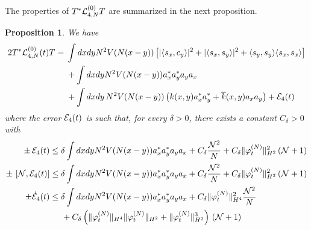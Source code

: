 \documentclass[11pt,a4paper,DIV11]{scrartcl}	%
\newtheorem{proposition}[thm]{Proposition}
\newcommand{\cE}{{\cal E}}
\newcommand{\cL}{{\cal L}}
\newcommand{\cN}{{\cal N}}
\begin{document}
The properties of $T^* \cL^{(0)}_{4,N} T$ are summarized in the next proposition. 
\begin{proposition}\label{prop:TL4T}
We have 
\begin{equation}\begin{split} 2 T^* \cL_{4,N}^{(0)} (t) T =\; & \int dx dy N^2 V (N (x-y)) \left[ |\langle s_x , c_y \rangle|^2  +  |\langle s_x , s_y \rangle|^2   + \langle s_y , s_y \rangle \langle s_x ,s_x \rangle \right] \\  &+ \int dx dy N^2 V (N (x-y)) a_x^* a_y^* a_y a_x \\ &+ \int dx dy \, N^2 V (N (x-y)) \left( k (x,y) a^*_x a^*_y + \overline{k} (x,y) a_x a_y \right) + \cE_4 (t) \end{split} \end{equation}
where the error $\cE_4 (t)$ is such that, for every $\delta > 0$, there exists a constant $C_\delta > 0$ with  
\begin{equation}\label{eq:TL4T-cl} 
\begin{split}
\pm \, \cE_4 (t) &\leq \delta \int dx dy N^2 V(N (x-y)) a_x^* a_y^* a_y a_x + C_\delta  \frac{\cN^2}{N}  + C_\delta \| \varphi_t^{(N)} \|_{H^2}^2 \left(\cN + 1 \right) \\
\pm \, \left[ \cN , \cE_4 (t) \right]  &\leq  \delta \int dx dy N^2 V(N (x-y)) a_x^* a_y^* a_y a_x + C_\delta \frac{\cN^2}{N} + C_\delta \| \varphi_t^{(N)} \|_{H^2}^2 \left(\cN + 1 \right) \\
\pm \dot{\cE}_4 (t) &\leq 
\delta \int dx dy N^2 V(N (x-y)) a_x^* a_y^* a_y a_x + C_\delta \| \varphi_t^{(N)} \|_{H^4}^2  \frac{\cN^2}{N} \\ &\hspace{.5cm} + C_\delta \left(\| \varphi_t^{(N)} \|_{H^4} \| \varphi_t^{(N)} \|_{H^2} + \| \varphi_t^{(N)} \|_{H^2}^3 \right) \, \left(\cN + 1 \right)
\end{split}
\end{equation}
\end{proposition}
\end{document}
